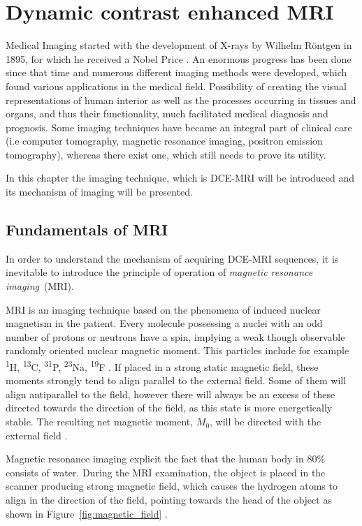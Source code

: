 \chapter{Dynamic contrast enhanced MRI}
	
Medical Imaging started with the development of X-rays by Wilhelm Röntgen in 1895, for which he received a Nobel Price \cite{rontgen1896new}. 
An enormous progress has been done since that time and numerous different imaging methods were developed, which found various applications in the medical field. Possibility of creating the visual representations of human interior as well as the processes occurring in tissues and organs, and thus their functionality, much facilitated medical diagnosis and prognosis.   
Some imaging techniques have became an integral part of clinical care (i.e computer tomography, magnetic resonance imaging, positron emission tomography), whereas there exist one, which still needs to prove its utility. 

In this chapter the imaging technique, which is DCE-MRI will be introduced and its mechanism of imaging will be presented.

\section{Fundamentals of MRI}
In order to understand the mechanism of acquiring DCE-MRI sequences, it is inevitable to introduce the principle of operation of \textit{magnetic resonance imaging}~(MRI).

MRI is an imaging technique based on the phenomena of induced nuclear  magnetism in the patient. Every molecule possessing a nuclei with an odd number of protons or neutrons  have a spin, implying a weak though observable randomly oriented nuclear magnetic moment. 
This particles include for example \textsuperscript{1}H, \textsuperscript{13}C, \textsuperscript{31}P, \textsuperscript{23}Na, \textsuperscript{19}F \nocite{bronzino1999biomedical}\cite{biomedical_hanbook_imaging, grover2015magnetic}. If placed in a strong static magnetic field, these moments strongly tend to align parallel to the external field. Some of them will align antiparallel to the field, however there will always be an excess of these directed towards the direction of the field, as this state is more energetically stable. The resulting net magnetic moment, $M_0$, will be directed with the external field \cite{bushong2014magnetic}.

Magnetic resonance imaging explicit the fact that the human body in 80\% consists of water. During the MRI examination, the object is placed in the scanner producing strong magnetic field, which causes the hydrogen atoms to align in the direction of the field, pointing towards the head of the object as shown in Figure~\ref{fig:magnetic_field} \cite{bushong2014magnetic}. 

